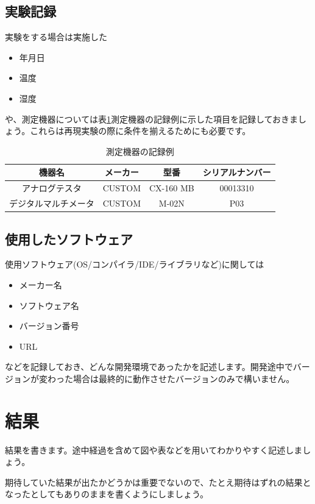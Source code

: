 \documentclass[dvipdfmx, a4paper]{jsarticle}
\begin{document}
\subsection{実験記録}
実験をする場合は実施した
\begin{itemize}
    \item 年月日
    \item 温度
    \item 湿度
\end{itemize}
や、測定機器については表\ref{tab:label_measure_table}測定機器の記録例に示した項目を記録しておきましょう。これらは再現実験の際に条件を揃えるためにも必要です。
\begin{table}[htbp]
    \centering
    \caption{測定機器の記録例}
    \label{tab:label_measure_table}
    \begin{tabular}{c|c|c|c} \hline
        機器名 & メーカー & 型番 & シリアルナンバー \\ \hline \hline
        アナログテスタ & CUSTOM & CX-160 MB & 00013310 \\ \hline
        デジタルマルチメータ & CUSTOM & M-02N & P03 \\ \hline
    \end{tabular}
\end{table}

\subsection{使用したソフトウェア}
使用ソフトウェア(OS/コンパイラ/IDE/ライブラリなど)に関しては
\begin{itemize}
    \item メーカー名
    \item ソフトウェア名
    \item バージョン番号
    \item URL
\end{itemize}

などを記録しておき、どんな開発環境であったかを記述します。開発途中でバージョンが変わった場合は最終的に動作させたバージョンのみで構いません。

\section{結果}
結果を書きます。途中経過を含めて図や表などを用いてわかりやすく記述しましょう。

期待していた結果が出たかどうかは重要でないので、たとえ期待はずれの結果となったとしてもありのままを書くようにしましょう。
\end{document}
